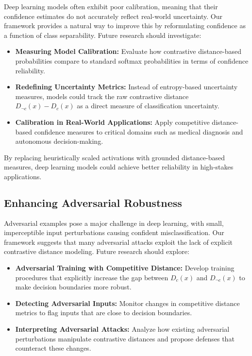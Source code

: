 Deep learning models often exhibit poor calibration, meaning that their confidence estimates do not accurately reflect real-world uncertainty. Our framework provides a natural way to improve this by reformulating confidence as a function of class separability. Future research should investigate:

\begin{itemize}
    \item \textbf{Measuring Model Calibration:} Evaluate how contrastive distance-based probabilities compare to standard softmax probabilities in terms of confidence reliability.
    \item \textbf{Redefining Uncertainty Metrics:} Instead of entropy-based uncertainty measures, models could track the raw contrastive distance \( D_{\neg c}(x) - D_c(x) \) as a direct measure of classification uncertainty.
    \item \textbf{Calibration in Real-World Applications:} Apply competitive distance-based confidence measures to critical domains such as medical diagnosis and autonomous decision-making.
\end{itemize}

By replacing heuristically scaled activations with grounded distance-based measures, deep learning models could achieve better reliability in high-stakes applications.

\subsection{Enhancing Adversarial Robustness}

Adversarial examples pose a major challenge in deep learning, with small, imperceptible input perturbations causing confident misclassification. Our framework suggests that many adversarial attacks exploit the lack of explicit contrastive distance modeling. Future research should explore:

\begin{itemize}
    \item \textbf{Adversarial Training with Competitive Distance:} Develop training procedures that explicitly increase the gap between \( D_c(x) \) and \( D_{\neg c}(x) \) to make decision boundaries more robust.
    \item \textbf{Detecting Adversarial Inputs:} Monitor changes in competitive distance metrics to flag inputs that are close to decision boundaries.
    \item \textbf{Interpreting Adversarial Attacks:} Analyze how existing adversarial perturbations manipulate contrastive distances and propose defenses that counteract these changes.
\end{itemize}

